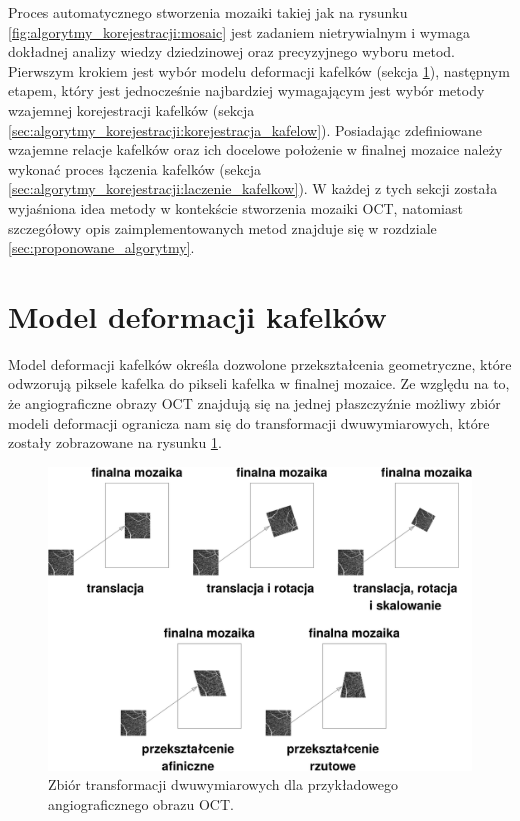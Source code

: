 Proces automatycznego stworzenia mozaiki takiej jak na rysunku \ref{fig:algorytmy_korejestracji:mosaic} jest zadaniem nietrywialnym i wymaga dokładnej analizy wiedzy dziedzinowej oraz precyzyjnego wyboru metod. Pierwszym krokiem jest wybór modelu deformacji kafelków (sekcja \ref{sec:algorytmy_korejestracji:model_deformacji}), następnym etapem, który jest jednocześnie najbardziej wymagającym jest wybór metody wzajemnej korejestracji kafelków (sekcja \ref{sec:algorytmy_korejestracji:korejestracja_kafelow}). Posiadając zdefiniowane wzajemne relacje kafelków oraz ich docelowe położenie w finalnej mozaice należy wykonać proces łączenia kafelków (sekcja \ref{sec:algorytmy_korejestracji:laczenie_kafelkow}). W każdej z tych sekcji została wyjaśniona idea metody w kontekście stworzenia mozaiki OCT, natomiast szczegółowy opis zaimplementowanych metod znajduje się w rozdziale \ref{sec:proponowane_algorytmy}.

\section{Model deformacji kafelków}
\label{sec:algorytmy_korejestracji:model_deformacji}

Model deformacji kafelków określa dozwolone przekształcenia geometryczne, które odwzorują piksele kafelka do pikseli kafelka w finalnej mozaice. Ze względu na to, że angiograficzne obrazy OCT znajdują się na jednej płaszczyźnie możliwy zbiór modeli deformacji ogranicza nam się do transformacji dwuwymiarowych, które zostały zobrazowane na rysunku \ref{fig:algorytmy_korejestracji:trans}.

\begin{figure}[H]
  \centering
  \includegraphics[width=\textwidth]{gfx/trans}
  \caption{Zbiór transformacji dwuwymiarowych dla przykładowego angiograficznego obrazu OCT.}
  \label{fig:algorytmy_korejestracji:trans}
\end{figure}

